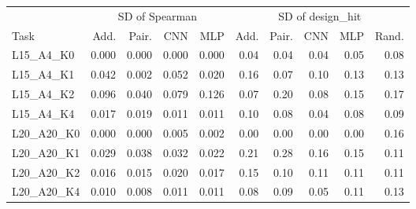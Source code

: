\begin{tabular}{lrrrr|rrrrr}
\toprule
 & \multicolumn{4}{c|}{SD of Spearman} & \multicolumn{5}{c}{SD of design\_hit}\\
Task & Add. & Pair. & CNN & MLP & Add. & Pair. & CNN & MLP & Rand.\\
\midrule
L15\_A4\_K0 & 0.000 & 0.000 & 0.000 & 0.000 & 0.04 & 0.04 & 0.04 & 0.05 & 0.08\\
L15\_A4\_K1 & 0.042 & 0.002 & 0.052 & 0.020 & 0.16 & 0.07 & 0.10 & 0.13 & 0.13\\
L15\_A4\_K2 & 0.096 & 0.040 & 0.079 & 0.126 & 0.07 & 0.20 & 0.08 & 0.15 & 0.17\\
L15\_A4\_K4 & 0.017 & 0.019 & 0.011 & 0.011 & 0.10 & 0.08 & 0.04 & 0.08 & 0.09\\
\midrule
L20\_A20\_K0 & 0.000 & 0.000 & 0.005 & 0.002 & 0.00 & 0.00 & 0.00 & 0.00 & 0.16\\
L20\_A20\_K1 & 0.029 & 0.038 & 0.032 & 0.022 & 0.21 & 0.28 & 0.16 & 0.15 & 0.11\\
L20\_A20\_K2 & 0.016 & 0.015 & 0.020 & 0.017 & 0.15 & 0.10 & 0.11 & 0.11 & 0.11\\
L20\_A20\_K4 & 0.010 & 0.008 & 0.011 & 0.011 & 0.08 & 0.09 & 0.05 & 0.11 & 0.13\\
\bottomrule
\end{tabular}
